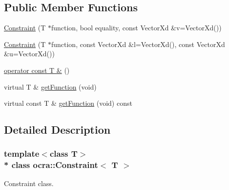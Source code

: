 \subsection*{Public Member Functions}
\begin{DoxyCompactItemize}
\item 
\hyperlink{classocra_1_1Constraint_a73cc6c5b8e5c29ae3c1d8ed997c9e6e5}{Constraint} (T $\ast$function, bool equality, const Vector\+Xd \&v=Vector\+Xd())
\item 
\hyperlink{classocra_1_1Constraint_aca55ef9a5ea48fa91d846c53f4e30ad1}{Constraint} (T $\ast$function, const Vector\+Xd \&l=Vector\+Xd(), const Vector\+Xd \&u=Vector\+Xd())
\item 
\hyperlink{classocra_1_1Constraint_a4a0f49dbc4042347872429298f689091}{operator const T \&} ()
\end{DoxyCompactItemize}
{\bf }\par
\begin{DoxyCompactItemize}
\item 
virtual T \& \hyperlink{classocra_1_1Constraint_a6083fd05133e7aefae68fc84641149c1}{get\+Function} (void)
\item 
virtual const T \& \hyperlink{classocra_1_1Constraint_a4f54599991630e2cf165a7bce12e9e7c}{get\+Function} (void) const 
\end{DoxyCompactItemize}



\subsection{Detailed Description}
\subsubsection*{template$<$class T$>$\\*
class ocra\+::\+Constraint$<$ T $>$}

Constraint class. 

